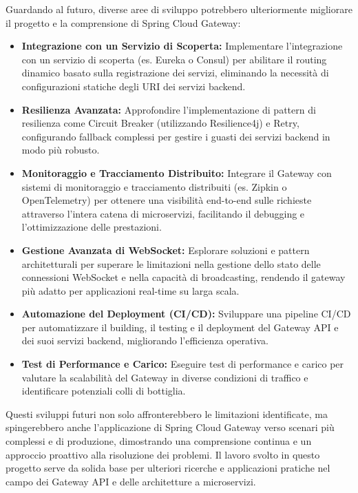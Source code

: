 Guardando al futuro, diverse aree di sviluppo potrebbero ulteriormente migliorare il progetto e la comprensione di Spring Cloud Gateway:

\begin{itemize}
    \item \textbf{Integrazione con un Servizio di Scoperta:} Implementare l'integrazione con un servizio di scoperta (es. Eureka o Consul) per abilitare il routing dinamico basato sulla registrazione dei servizi, eliminando la necessità di configurazioni statiche degli URI dei servizi backend.
    \item \textbf{Resilienza Avanzata:} Approfondire l'implementazione di pattern di resilienza come Circuit Breaker (utilizzando Resilience4j) e Retry, configurando fallback complessi per gestire i guasti dei servizi backend in modo più robusto.
    \item \textbf{Monitoraggio e Tracciamento Distribuito:} Integrare il Gateway con sistemi di monitoraggio e tracciamento distribuiti (es. Zipkin o OpenTelemetry) per ottenere una visibilità end-to-end sulle richieste attraverso l'intera catena di microservizi, facilitando il debugging e l'ottimizzazione delle prestazioni.
    \item \textbf{Gestione Avanzata di WebSocket:} Esplorare soluzioni e pattern architetturali per superare le limitazioni nella gestione dello stato delle connessioni WebSocket e nella capacità di broadcasting, rendendo il gateway più adatto per applicazioni real-time su larga scala.
    \item \textbf{Automazione del Deployment (CI/CD):} Sviluppare una pipeline CI/CD per automatizzare il building, il testing e il deployment del Gateway API e dei suoi servizi backend, migliorando l'efficienza operativa.
    \item \textbf{Test di Performance e Carico:} Eseguire test di performance e carico per valutare la scalabilità del Gateway in diverse condizioni di traffico e identificare potenziali colli di bottiglia.
\end{itemize}

Questi sviluppi futuri non solo affronterebbero le limitazioni identificate, ma spingerebbero anche l'applicazione di Spring Cloud Gateway verso scenari più complessi e di produzione, dimostrando una comprensione continua e un approccio proattivo alla risoluzione dei problemi. Il lavoro svolto in questo progetto serve da solida base per ulteriori ricerche e applicazioni pratiche nel campo dei Gateway API e delle architetture a microservizi.